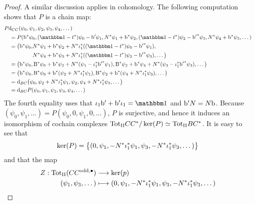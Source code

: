 \documentclass[\MainFolder/Text.tex]{subfiles}
\begin{document}
\begin{proof}
A similar discussion applies in cohomology. The following computation shows that $P$ is a chain map:
\begin{align*}
 &P \Dd_{\LodCycBi}(\psi_0,\psi_1,\psi_2, \psi_3, \psi_4,\dotsc) \\
 &\quad = P(\Hd^*\psi_0,(\Id-\CycPermOp^*)\psi_0 - \Hd'\psi_1,\CountOp^*\psi_1+ \Hd^*\psi_2,(\Id-\CycPermOp^*)\psi_2 - {\Hd'}^*\psi_3, \CountOp^*\psi_4 + \Hd^*\psi_3, \dotsc ) \\
 &\quad = \begin{aligned}[t]
  \bigl(\Hd^*\psi_0, & \CountOp^*\psi_1 + \Hd^*\psi_2 + \CountOp^*\InsOneOp_1^*((\Id-\CycPermOp^*)\psi_0 - {\Hd'}^*\psi_1), \\
  & \CountOp^*\psi_4 + \Hd^*\psi_3+ \CountOp^*\InsOneOp_1^*((\Id-\CycPermOp^*)\psi_2 - {\Hd'}^*\psi_3),\dotsc\bigr)
 \end{aligned} \\
 &\quad=\begin{aligned}[t]
 \bigl(\Hd^*\psi_0, \Cd^* \psi_0 + \Hd^* \psi_2 + \CountOp^*(\psi_1 - \InsOneOp_1^*{\Hd'}^* \psi_1), \Cd^* \psi_2 + \Hd^* \psi_4 + \CountOp^*(\psi_3 - \InsOneOp_1^*{\Hd'}^* \psi_3),\dotsc  \bigr)
\end{aligned}\\
&\quad = \bigl(\Hd^*\psi_0, \Cd^*\psi_0 + \Hd^*(\psi_2 + \CountOp^*\InsOneOp_1^* \psi_1), \Cd^*\psi_2 + \Hd^*(\psi_4 + \CountOp^*\InsOneOp_1^* \psi_3), \dotsc \bigr) \\
&\quad = \Dd_{\ConCycBi}\bigl(\psi_0,\psi_2 + \CountOp^*\InsOneOp_1^*\psi_1, \psi_2, \psi_4 + \CountOp^*\InsOneOp_1^*\psi_3,\dotsc\bigr)\\
&\quad = \Dd_{\ConCycBi} P (\psi_0,\psi_1,\psi_2,\psi_3,\psi_4,\dotsc)
\end{align*}
The fourth equality uses that $\InsOneOp_1 \Hd' + \Hd' \InsOneOp_1 = \Id$ and $\mathrm{b}'N = N\mathrm{b}$. Because $(\psi_0,\psi_1,\dotsc) = P(\psi_0,0,\psi_1,0,\dotsc )$, $P$ is surjective, and hence it induces an isomorphism of cochain complexes ${\mathrm{Tot}_{\mathrm{II}}} CC^*/\ker(P) \simeq {\mathrm{Tot}_{\mathrm{II}}} BC^*$.  It is easy to see that 
$$ \ker(P) = \bigl\{(0,\psi_1,-N^*\iota_1^*\psi_1,\psi_3,-N^*\iota_1^*\psi_3,\dotsc)\bigr\} $$
and that the map
\begin{align*}
Z: {\mathrm{Tot}_{\mathrm{II}}}(CC^{\mathrm{odd},\bullet}) &\longrightarrow \ker(p) \\
(\psi_1, \psi_3, \dotsc) &\longmapsto (0 ,\psi_1, -N^* \iota_1^* \psi_1, \psi_3, -N^* \iota_1^* \psi_3, \dotsc )
\end{align*}

\end{proof}
\end{document}
